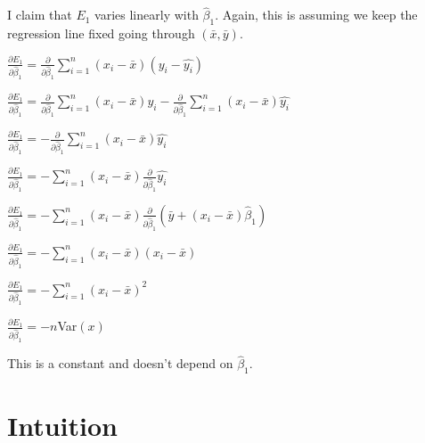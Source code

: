 \documentclass{article}
\begin{document}
I claim that $E_1$ varies linearly with $\hat{\beta}_1$. Again, this is assuming we keep the regression line fixed going through $(\bar{x}, \bar{y})$.

$\frac{\partial E_1}{\partial \hat{\beta}_1} = \frac{\partial}{\partial \hat{\beta}_1} \sum_{i=1}^{n}(x_i-\bar{x})(y_i-\hat{y_i})$

$\frac{\partial E_1}{\partial \hat{\beta}_1} = \frac{\partial}{\partial \hat{\beta}_1} \sum_{i=1}^{n}(x_i-\bar{x})y_i - \frac{\partial}{\partial \hat{\beta}_1} \sum_{i=1}^{n}(x_i-\bar{x})\hat{y_i}$

$\frac{\partial E_1}{\partial \hat{\beta}_1} = - \frac{\partial}{\partial \hat{\beta}_1} \sum_{i=1}^{n}(x_i-\bar{x})\hat{y_i}$

$\frac{\partial E_1}{\partial \hat{\beta}_1} = - \sum_{i=1}^{n}(x_i-\bar{x}) \frac{\partial}{\partial \hat{\beta}_1} \hat{y_i}$

$\frac{\partial E_1}{\partial \hat{\beta}_1} = - \sum_{i=1}^{n}(x_i-\bar{x}) \frac{\partial}{\partial \hat{\beta}_1} (\bar{y} + (x_i-\bar{x}) \hat{\beta}_1)$

$\frac{\partial E_1}{\partial \hat{\beta}_1} = - \sum_{i=1}^{n}(x_i-\bar{x}) (x_i-\bar{x})$

$\frac{\partial E_1}{\partial \hat{\beta}_1} = - \sum_{i=1}^{n}(x_i-\bar{x})^2$

$\frac{\partial E_1}{\partial \hat{\beta}_1} = - n $Var$(x)$

This is a constant and doesn't depend on $\hat{\beta}_1$.

\section{Intuition}
\end{document}

